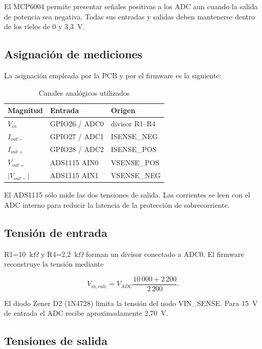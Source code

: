 \documentclass[conference]{IEEEtran}
\begin{document}
El MCP6004 permite presentar señales positivas a los ADC aun cuando la salida de potencia sea negativa. Todas sus entradas y salidas deben mantenerse dentro de los rieles de 0 y 3,3~V.

\subsection{Asignación de mediciones}

La asignación empleada por la PCB y por el firmware es la siguiente:

\begin{table}[!t]
\caption{Canales analógicos utilizados}
\label{tab:analogicos}
\centering
\footnotesize
\begin{tabular}{@{}lll@{}}
\toprule
\textbf{Magnitud} & \textbf{Entrada} & \textbf{Origen} \\
\midrule
$V_{in}$ & GPIO26 / ADC0 & divisor R1--R4 \\
$I_{out-}$ & GPIO27 / ADC1 & ISENSE\_NEG \\
$I_{out+}$ & GPIO28 / ADC2 & ISENSE\_POS \\
$V_{out+}$ & ADS1115 AIN0 & VSENSE\_POS \\
$|V_{out-}|$ & ADS1115 AIN1 & VSENSE\_NEG \\
\bottomrule
\end{tabular}
\end{table}

El ADS1115 sólo mide las dos tensiones de salida. Las corrientes se leen con el ADC interno para reducir la latencia de la protección de sobrecorriente.

\subsection{Tensión de entrada}

R1=10~k$\Omega$ y R4=2,2~k$\Omega$ forman un divisor conectado a ADC0. El firmware reconstruye la tensión mediante

\begin{equation}
V_{in,calc}=V_{ADC}\frac{10\,000+2\,200}{2\,200}.
\end{equation}

El diodo Zener D2 (1N4728) limita la tensión del nodo VIN\_SENSE. Para 15~V de entrada el ADC recibe aproximadamente 2,70~V.

\subsection{Tensiones de salida}
\end{document}
